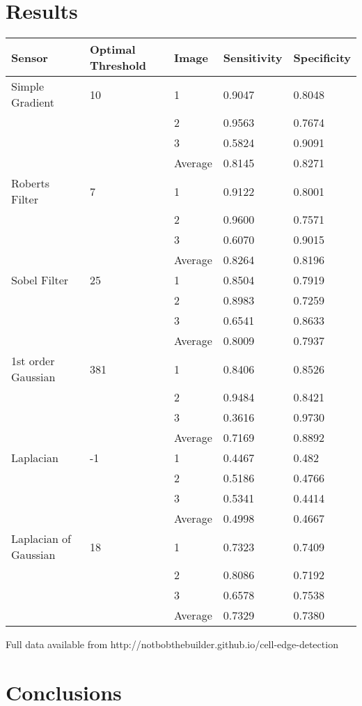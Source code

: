 \documentclass[12pt]{article}
\begin{document}
  \section{Results}
  \begin{center}
    \begin{tabular}{|l|l|l|l| l |}
      \hline
      Sensor & Optimal Threshold & Image & Sensitivity & Specificity\\
      \hline
      Simple Gradient & 10 &  1 & 0.9047 & 0.8048\\
                          &&  2 & 0.9563 & 0.7674\\
                          &&  3 & 0.5824 & 0.9091\\
                     && Average & 0.8145 & 0.8271\\\hline
      Roberts Filter & 7 & 1 & 0.9122 & 0.8001\\
                        && 2 & 0.9600 & 0.7571\\
                        && 3 & 0.6070 & 0.9015\\
                  && Average & 0.8264 & 0.8196\\\hline
      Sobel Filter & 25 & 1 & 0.8504 & 0.7919\\
                      &&  2 & 0.8983 & 0.7259\\
                      &&  3 & 0.6541 & 0.8633\\
                  && Average & 0.8009 & 0.7937\\\hline
      1st order Gaussian & 381 & 1 & 0.8406 & 0.8526\\
                              && 2 & 0.9484 & 0.8421\\
                              && 3 & 0.3616 & 0.9730\\
                        && Average & 0.7169 & 0.8892\\\hline
      Laplacian & -1 & 1 & 0.4467 & 0.482\\
                    && 2 & 0.5186 & 0.4766\\
                    && 3 & 0.5341 & 0.4414\\
              && Average & 0.4998 & 0.4667\\\hline
      Laplacian of Gaussian & 18 & 1 & 0.7323 & 0.7409\\
                                && 2 & 0.8086 & 0.7192\\
                                && 3 & 0.6578 & 0.7538\\
                          && Average & 0.7329 & 0.7380\\\hline
    \end{tabular}

    Full data available from http://notbobthebuilder.github.io/cell-edge-detection
  \end{center}
  \section{Conclusions}
\end{document}
